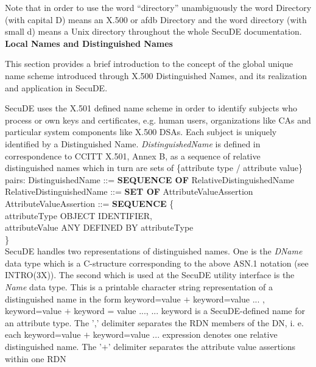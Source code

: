 Note that in order to use the word ``directory'' unambiguously the word
Directory (with capital D) means an X.500 or afdb Directory and the word
directory (with small d) means a Unix directory throughout the whole
SecuDE documentation. 
\\ [1em]
{\bf Local Names and Distinguished Names}

This section provides a brief introduction to the concept of the global
unique name scheme introduced through X.500 Distinguished Names,
and its realization and application in SecuDE.
  
SecuDE uses the X.501 defined name scheme in order to identify subjects who
process or own keys and certificates, e.g. human users, organizations like 
CAs and
particular system components like X.500 DSAs. Each subject is uniquely
identified by a Distinguished Name. 
{\em DistinguishedName} is defined in correspondence to CCITT X.501, Annex 
B, as
a sequence of relative distinguished names which in turn are sets
of \{attribute type / attribute value\} pairs:
{\small
\bvtab
DistinguishedName ::= \6 {\bf SEQUENCE OF} RelativeDistinguishedName                  
\\ [1ex]
RelativeDistinguishedName ::= \6 {\bf SET OF} AttributeValueAssertion                 
\\ [1ex]
AttributeValueAssertion ::= \6 {\bf SEQUENCE} \{                                      
\\
                               \7 attributeType \3 OBJECT IDENTIFIER,                 
\\
                               \7 attributeValue \3 ANY DEFINED BY 
attributeType      \\
                            \6 \} \\
\evtab                             
}
SecuDE handles two representations of distinguished names. One is the {\em 
DName}
data type which is a C-structure corresponding to the above ASN.1 notation 
(see INTRO(3X)). 
The second which is used at the SecuDE utility interface is the {\em Name} 
data type.
This is a printable character string representation
of a distinguished name in the form
\bc
{\small keyword=value $+$ keyword=value ... , keyword=value $+$ keyword = 
value ..., ...}
\ec
keyword is a SecuDE-defined name for an attribute type. 
The ',' delimiter separates the RDN members of the DN, i. e. each 
keyword=value $+$ keyword=value ... expression denotes one relative 
distinguished name.
The '$+$' delimiter separates the attribute value assertions within one RDN
